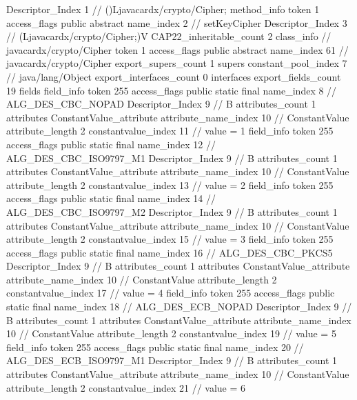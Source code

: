 {{{{{					Descriptor_Index	1		// ()Ljavacardx/crypto/Cipher;
				}
				method_info {
					token	1
					access_flags	public abstract
					name_index	2		// setKeyCipher
					Descriptor_Index	3		// (Ljavacardx/crypto/Cipher;)V
				}
			}
			CAP22_inheritable_count	2
		}
		class_info {		// javacardx/crypto/Cipher
			token	1
			access_flags	public abstract
			name_index	61		// javacardx/crypto/Cipher
			export_supers_count	1
			supers {
				constant_pool_index	7		// java/lang/Object
			}
			export_interfaces_count	0
			interfaces {
			}
			export_fields_count	19
			fields {
			field_info {
				token	255
				access_flags	public static final
				name_index	8		// ALG_DES_CBC_NOPAD
				Descriptor_Index	9		// B
				attributes_count	1
				attributes {
				ConstantValue_attribute {
					attribute_name_index	10		// ConstantValue
					attribute_length	2
					constantvalue_index	11		// value = 1
				}
				}
			}
			field_info {
				token	255
				access_flags	public static final
				name_index	12		// ALG_DES_CBC_ISO9797_M1
				Descriptor_Index	9		// B
				attributes_count	1
				attributes {
				ConstantValue_attribute {
					attribute_name_index	10		// ConstantValue
					attribute_length	2
					constantvalue_index	13		// value = 2
				}
				}
			}
			field_info {
				token	255
				access_flags	public static final
				name_index	14		// ALG_DES_CBC_ISO9797_M2
				Descriptor_Index	9		// B
				attributes_count	1
				attributes {
				ConstantValue_attribute {
					attribute_name_index	10		// ConstantValue
					attribute_length	2
					constantvalue_index	15		// value = 3
				}
				}
			}
			field_info {
				token	255
				access_flags	public static final
				name_index	16		// ALG_DES_CBC_PKCS5
				Descriptor_Index	9		// B
				attributes_count	1
				attributes {
				ConstantValue_attribute {
					attribute_name_index	10		// ConstantValue
					attribute_length	2
					constantvalue_index	17		// value = 4
				}
				}
			}
			field_info {
				token	255
				access_flags	public static final
				name_index	18		// ALG_DES_ECB_NOPAD
				Descriptor_Index	9		// B
				attributes_count	1
				attributes {
				ConstantValue_attribute {
					attribute_name_index	10		// ConstantValue
					attribute_length	2
					constantvalue_index	19		// value = 5
				}
				}
			}
			field_info {
				token	255
				access_flags	public static final
				name_index	20		// ALG_DES_ECB_ISO9797_M1
				Descriptor_Index	9		// B
				attributes_count	1
				attributes {
				ConstantValue_attribute {
					attribute_name_index	10		// ConstantValue
					attribute_length	2
					constantvalue_index	21		// value = 6
				}
				}
			}
}}}}
